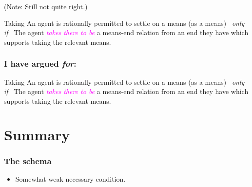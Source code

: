 \documentclass[noamssymb, compress, handout]{beamer} %
\newcommand{\hozlinedash}[0]{%
  \noindent\hdashrule[0.5ex][c]{\textwidth}{.1pt}{2.5pt}
}
\begin{document}
\begin{frame}
  (Note: Still not quite right.)

  \hozlinedash

  {\footnotesize
    \begin{block}{Taking}
      An agent is rationally permitted to settle on a means (as a means)
      \newline
      \mbox{ }\hfill\emph{only if}\hfill\mbox{ }
      \newline
      The agent \textcolor{fuchsia}{\emph{takes there to be}}  a means-end relation from an end they have which supports taking the relevant means.
    \end{block}
  }
\end{frame}

\begin{frame}
  \frametitle{I have argued \emph{for}:}
    \begin{block}{Taking}
    An agent is rationally permitted to settle on a means (as a means)
    \newline
    \mbox{ }\hfill\emph{only if}\hfill\mbox{ }
    \newline
    The agent \textcolor{fuchsia}{\emph{takes there to be}} a means-end relation from an end they have which supports taking the relevant means.
  \end{block}
\end{frame}

\section{Summary}
\label{sec:summary}


\begin{frame}
  \frametitle{The schema}



  \begin{itemize}
  \item Somewhat weak necessary condition.
    
  \end{itemize}
\end{frame}
\end{document}
